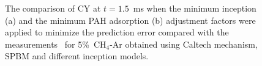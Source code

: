 \begin{figure}[H]
	\centering
	\caption{The comparison of CY at $t=1.5$~ms when the minimum inception (a) and the minimum PAH adsorption (b) adjustment factors were applied to minimize the prediction error compared with the measurements~\citep{agafonov2016unified} for 5\%~$\mathrm{CH_4}$-Ar obtained using Caltech mechanism, SPBM and different inception models.}
	\label{fig:shockagof_yield_maxincads_cpr} 
\end{figure}


